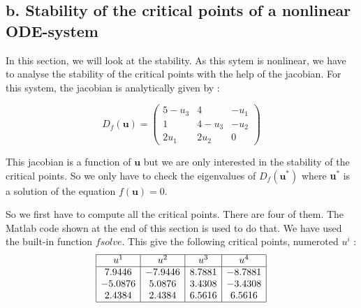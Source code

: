 \subsection*{b. Stability of the critical points of a nonlinear ODE-system}

In this section, we will look at the stability. As this sytem is nonlinear, we have to analyse the stability of the critical points with the help of the jacobian. For this system, the jacobian is analytically given by : 

$$D_f(\textbf{u}) = \left(\begin{array}{ccc}
5-u_3 & 4 & -u_1 \\ 
1 & 4-u_3 & -u_2 \\ 
2u_1 & 2u_2 & 0
\end{array} \right)$$

This jacobian is a function of $\textbf{u}$ but we are only interested in the stability of the critical points. So we only have to check the eigenvalues of $D_f(\textbf{u}^*)$ where \textbf{u$^*$} is a solution of the equation $f(\textbf{u})=0$.

So we first have to compute all the critical points. There are four of them. The Matlab code shown at the end of this section is used to do that. We have used the built-in function $fsolve$. This give the following critical points, numeroted $u^i$ : 
$$\begin{array}{|c|c|c|c|}
\hline
u^1 & u^2 & u^3 & u^4 \\ 
\hline
7.9446 & -7.9446 & 8.7881 & -8.7881 \\ 
-5.0876 & 5.0876 & 3.4308 & -3.4308 \\ 
2.4384 & 2.4384 & 6.5616 & 6.5616\\
\hline
\end{array} $$




